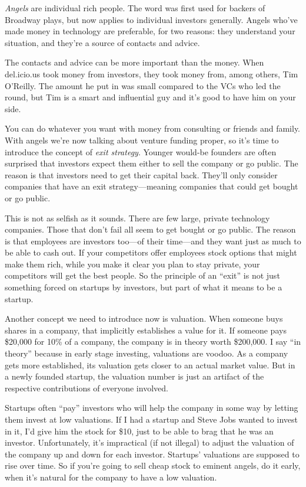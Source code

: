 \emph{Angels} are individual rich people. The word was first used for
backers of Broadway plays, but now applies to individual investors
generally. Angels who've made money in technology are preferable, for
two reasons: they understand your situation, and they're a source of
contacts and advice.

The contacts and advice can be more important than the money. When
del.icio.us took money from investors, they took money from, among
others, Tim O'Reilly. The amount he put in was small compared to the VCs
who led the round, but Tim is a smart and influential guy and it's good
to have him on your side.

You can do whatever you want with money from consulting or friends and
family. With angels we're now talking about venture funding proper, so
it's time to introduce the concept of \emph{exit strategy}. Younger
would-be founders are often surprised that investors expect them either
to sell the company or go public. The reason is that investors need to
get their capital back. They'll only consider companies that have an
exit strategy---meaning companies that could get bought or go public.

This is not as selfish as it sounds. There are few large, private
technology companies. Those that don't fail all seem to get bought or go
public. The reason is that employees are investors too---of their
time---and they want just as much to be able to cash out. If your
competitors offer employees stock options that might make them rich,
while you make it clear you plan to stay private, your competitors will
get the best people. So the principle of an ``exit'' is not just
something forced on startups by investors, but part of what it means to
be a startup.

Another concept we need to introduce now is valuation. When someone buys
shares in a company, that implicitly establishes a value for it. If
someone pays \$20,000 for 10\% of a company, the company is in theory
worth \$200,000. I say ``in theory'' because in early stage investing,
valuations are voodoo. As a company gets more established, its valuation
gets closer to an actual market value. But in a newly founded startup,
the valuation number is just an artifact of the respective contributions
of everyone involved.

Startups often ``pay'' investors who will help the company in some way
by letting them invest at low valuations. If I had a startup and Steve
Jobs wanted to invest in it, I'd give him the stock for \$10, just to be
able to brag that he was an investor. Unfortunately, it's impractical
(if not illegal) to adjust the valuation of the company up and down for
each investor. Startups' valuations are supposed to rise over time. So
if you're going to sell cheap stock to eminent angels, do it early, when
it's natural for the company to have a low valuation.

